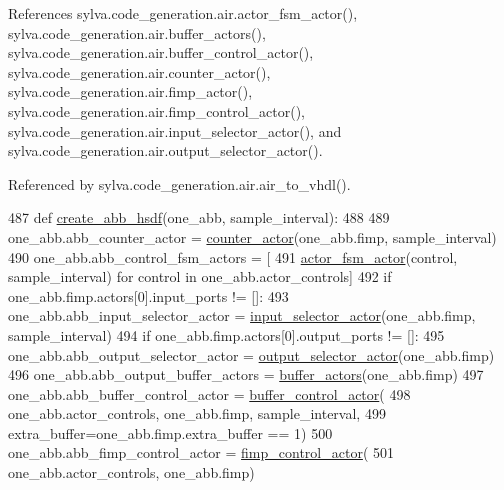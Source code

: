 References sylva.\+code\+\_\+generation.\+air.\+actor\+\_\+fsm\+\_\+actor(), sylva.\+code\+\_\+generation.\+air.\+buffer\+\_\+actors(), sylva.\+code\+\_\+generation.\+air.\+buffer\+\_\+control\+\_\+actor(), sylva.\+code\+\_\+generation.\+air.\+counter\+\_\+actor(), sylva.\+code\+\_\+generation.\+air.\+fimp\+\_\+actor(), sylva.\+code\+\_\+generation.\+air.\+fimp\+\_\+control\+\_\+actor(), sylva.\+code\+\_\+generation.\+air.\+input\+\_\+selector\+\_\+actor(), and sylva.\+code\+\_\+generation.\+air.\+output\+\_\+selector\+\_\+actor().



Referenced by sylva.\+code\+\_\+generation.\+air.\+air\+\_\+to\+\_\+vhdl().


\begin{DoxyCode}
487 \textcolor{keyword}{def }\hyperlink{namespacesylva_1_1code__generation_1_1air_a5a2588aa1c35ad4bd47d3b8f7eeca94a}{create\_abb\_hsdf}(one\_abb, sample\_interval):
488 
489     one\_abb.abb\_counter\_actor = \hyperlink{namespacesylva_1_1code__generation_1_1air_a50394584613c57985bc89c8fa14a058f}{counter\_actor}(one\_abb.fimp, sample\_interval)
490     one\_abb.abb\_control\_fsm\_actors = [
491         \hyperlink{namespacesylva_1_1code__generation_1_1air_a29263a2d50cecb3cf4e5aa3b684c4666}{actor\_fsm\_actor}(control, sample\_interval) \textcolor{keywordflow}{for} control \textcolor{keywordflow}{in} one\_abb.actor\_controls]
492     \textcolor{keywordflow}{if} one\_abb.fimp.actors[0].input\_ports != []:
493         one\_abb.abb\_input\_selector\_actor = \hyperlink{namespacesylva_1_1code__generation_1_1air_aaa165d9fb26a2af721734a446b1549fa}{input\_selector\_actor}(one\_abb.fimp, 
      sample\_interval)
494     \textcolor{keywordflow}{if} one\_abb.fimp.actors[0].output\_ports != []:
495         one\_abb.abb\_output\_selector\_actor = \hyperlink{namespacesylva_1_1code__generation_1_1air_a3e01248fb07a8e940919fe35ddcd684e}{output\_selector\_actor}(one\_abb.fimp)
496         one\_abb.abb\_output\_buffer\_actors = \hyperlink{namespacesylva_1_1code__generation_1_1air_a2437e8f4411d574d2a354bee377e1e31}{buffer\_actors}(one\_abb.fimp)
497         one\_abb.abb\_buffer\_control\_actor = \hyperlink{namespacesylva_1_1code__generation_1_1air_a1a46162a8988513e15b0b45a4b456340}{buffer\_control\_actor}(
498             one\_abb.actor\_controls, one\_abb.fimp, sample\_interval,
499             extra\_buffer=one\_abb.fimp.extra\_buffer == 1)
500     one\_abb.abb\_fimp\_control\_actor = \hyperlink{namespacesylva_1_1code__generation_1_1air_a2ea6ae18c1f30dcbc16f01d32d092979}{fimp\_control\_actor}(
501         one\_abb.actor\_controls, one\_abb.fimp)

\end{DoxyCode}
